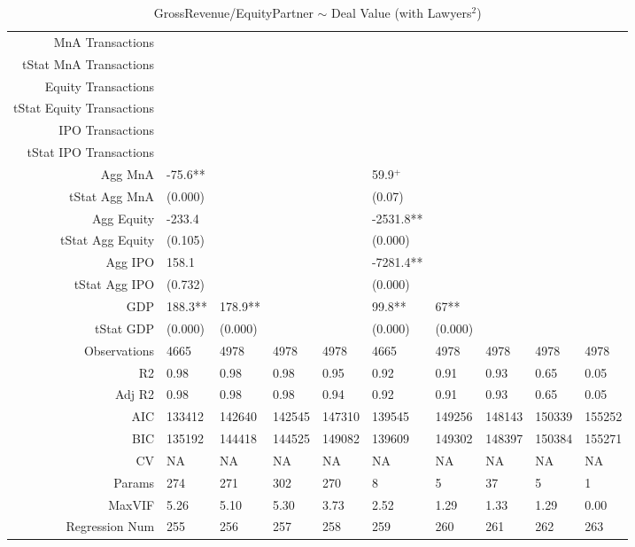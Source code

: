 \begin{table}[ht]
\begin{tabular}{rlllllllll}
  MnA Transactions &  &  &  &  &  &  &  &  &  \\ 
  tStat MnA Transactions &  &  &  &  &  &  &  &  &  \\ 
  Equity Transactions &  &  &  &  &  &  &  &  &  \\ 
  tStat Equity Transactions &  &  &  &  &  &  &  &  &  \\ 
  IPO Transactions &  &  &  &  &  &  &  &  &  \\ 
  tStat IPO Transactions &  &  &  &  &  &  &  &  &  \\ 
  Agg MnA & -75.6** &  &  &  & 59.9$^{+}$ &  &  &  &  \\ 
  tStat Agg MnA & (0.000) &  &  &  & (0.07) &  &  &  &  \\ 
  Agg Equity & -233.4 &  &  &  & -2531.8** &  &  &  &  \\ 
  tStat Agg Equity & (0.105) &  &  &  & (0.000) &  &  &  &  \\ 
  Agg IPO & 158.1 &  &  &  & -7281.4** &  &  &  &  \\ 
  tStat Agg IPO & (0.732) &  &  &  & (0.000) &  &  &  &  \\ 
  GDP & 188.3** & 178.9** &  &  & 99.8** & 67** &  &  &  \\ 
  tStat GDP & (0.000) & (0.000) &  &  & (0.000) & (0.000) &  &  &  \\ 
  Observations & 4665 & 4978 & 4978 & 4978 & 4665 & 4978 & 4978 & 4978 & 4978 \\ 
  R2 & 0.98 & 0.98 & 0.98 & 0.95 & 0.92 & 0.91 & 0.93 & 0.65 & 0.05 \\ 
  Adj R2 & 0.98 & 0.98 & 0.98 & 0.94 & 0.92 & 0.91 & 0.93 & 0.65 & 0.05 \\ 
  AIC & 133412 & 142640 & 142545 & 147310 & 139545 & 149256 & 148143 & 150339 & 155252 \\ 
  BIC & 135192 & 144418 & 144525 & 149082 & 139609 & 149302 & 148397 & 150384 & 155271 \\ 
  CV & NA & NA & NA & NA & NA & NA & NA & NA & NA \\ 
  Params & 274 & 271 & 302 & 270 & 8 & 5 & 37 & 5 & 1 \\ 
  MaxVIF & 5.26 & 5.10 & 5.30 & 3.73 & 2.52 & 1.29 & 1.33 & 1.29 & 0.00 \\ 
  Regression Num & 255 & 256 & 257 & 258 & 259 & 260 & 261 & 262 & 263 \\ 
   \hline
\end{tabular}
\caption{GrossRevenue/EquityPartner $\sim$ Deal Value (with Lawyers$^2$)} 
\end{table}
